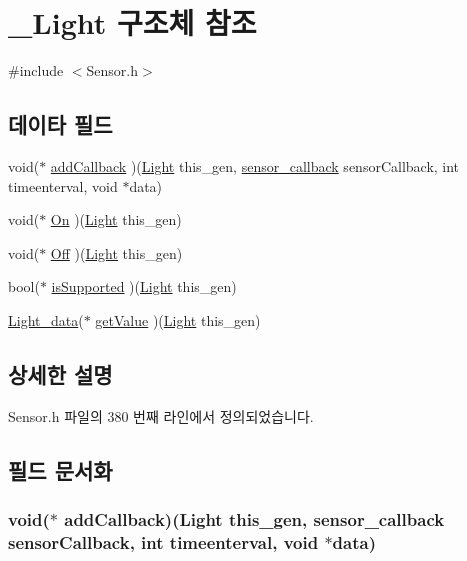 \hypertarget{struct___light}{\section{\-\_\-\-Light 구조체 참조}
\label{struct___light}
}


{\ttfamily \#include $<$Sensor.\-h$>$}

\subsection*{데이타 필드}
\begin{DoxyCompactItemize}
\item 
void($\ast$ \hyperlink{struct___light_a5c74ab5e1abaf06b4188b922d3646e6c}{add\-Callback} )(\hyperlink{_sensor_8h_a51c7b02c797bd458035bde93d4cf87e8}{Light} this\-\_\-gen, \hyperlink{_sensor_8h_ad8114207845fc5e0aa30832f0c718cd6}{sensor\-\_\-callback} sensor\-Callback, int timeenterval, void $\ast$data)
\item 
void($\ast$ \hyperlink{struct___light_a5c0d86bf418b917aa9aa5a9eed12dcca}{On} )(\hyperlink{_sensor_8h_a51c7b02c797bd458035bde93d4cf87e8}{Light} this\-\_\-gen)
\item 
void($\ast$ \hyperlink{struct___light_a774f07653a84b4ea9c2a31db11fd7281}{Off} )(\hyperlink{_sensor_8h_a51c7b02c797bd458035bde93d4cf87e8}{Light} this\-\_\-gen)
\item 
bool($\ast$ \hyperlink{struct___light_a26d33e377912ff1d4fc10f17c512231b}{is\-Supported} )(\hyperlink{_sensor_8h_a51c7b02c797bd458035bde93d4cf87e8}{Light} this\-\_\-gen)
\item 
\hyperlink{_sensor_8h_a457745a8acf045e2ed86752fb84543f4}{Light\-\_\-data}($\ast$ \hyperlink{struct___light_a167b8ee698bc8f2db75089756d4d58d3}{get\-Value} )(\hyperlink{_sensor_8h_a51c7b02c797bd458035bde93d4cf87e8}{Light} this\-\_\-gen)
\end{DoxyCompactItemize}


\subsection{상세한 설명}


Sensor.\-h 파일의 380 번째 라인에서 정의되었습니다.



\subsection{필드 문서화}
\hypertarget{struct___light_a5c74ab5e1abaf06b4188b922d3646e6c}{
\subsubsection[{add\-Callback}]{\setlength{\rightskip}{0pt plus 5cm}void($\ast$  add\-Callback)({\bf Light} this\-\_\-gen, {\bf sensor\-\_\-callback} sensor\-Callback, int timeenterval, void $\ast$data)}}\label{struct___light_a5c74ab5e1abaf06b4188b922d3646e6c}



